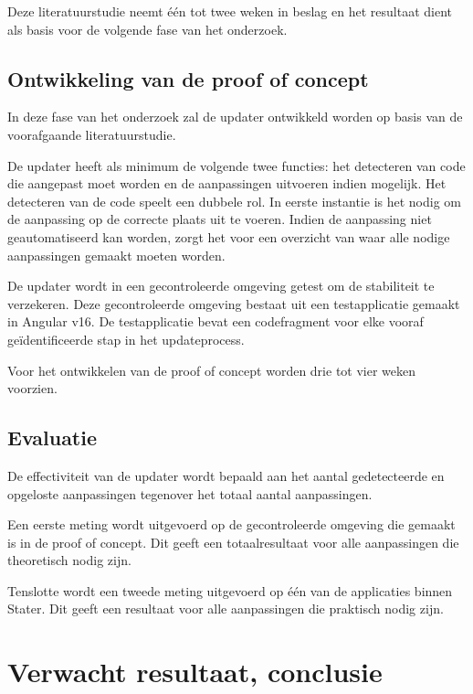 Deze literatuurstudie neemt één tot twee weken in beslag en het resultaat dient als basis voor de volgende fase van het onderzoek.

\subsection{Ontwikkeling van de proof of concept}

In deze fase van het onderzoek zal de updater ontwikkeld worden op basis van de voorafgaande literatuurstudie.

De updater heeft als minimum de volgende twee functies: het detecteren van code die aangepast moet worden en de aanpassingen uitvoeren indien mogelijk.
Het detecteren van de code speelt een dubbele rol.
In eerste instantie is het nodig om de aanpassing op de correcte plaats uit te voeren.
Indien de aanpassing niet geautomatiseerd kan worden, zorgt het voor een overzicht van waar alle nodige aanpassingen gemaakt moeten worden.

De updater wordt in een gecontroleerde omgeving getest om de stabiliteit te verzekeren.
Deze gecontroleerde omgeving bestaat uit een testapplicatie gemaakt in Angular v16.
De testapplicatie bevat een codefragment voor elke vooraf geïdentificeerde stap in het updateprocess.

Voor het ontwikkelen van de proof of concept worden drie tot vier weken voorzien.

\subsection{Evaluatie}

De effectiviteit van de updater wordt bepaald aan het aantal gedetecteerde en opgeloste aanpassingen tegenover het totaal aantal aanpassingen.

Een eerste meting wordt uitgevoerd op de gecontroleerde omgeving die gemaakt is in de proof of concept.
Dit geeft een totaalresultaat voor alle aanpassingen die theoretisch nodig zijn.

Tenslotte wordt een tweede meting uitgevoerd op één van de applicaties binnen Stater.
Dit geeft een resultaat voor alle aanpassingen die praktisch nodig zijn.

\section{Verwacht resultaat, conclusie}
\label{sec:verwachte_resultaten}

